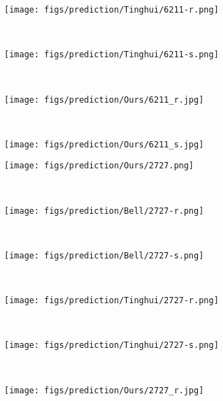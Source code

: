 \documentclass[10pt,twocolumn,letterpaper]{article}
\begin{document}
\begin{figure*}[ptb]
    \begin{subfigure}[b]{0.135\textwidth}
        \texttt{[image: figs/prediction/Tinghui/6211-r.png]}
    \end{subfigure} \hspace*{-0.8em}
    ~    
    \begin{subfigure}[b]{0.135\textwidth}
        \texttt{[image: figs/prediction/Tinghui/6211-s.png]}
    \end{subfigure}   \hspace*{-0.8em}
    ~
    \begin{subfigure}[b]{0.135\textwidth}
        \texttt{[image: figs/prediction/Ours/6211\_r.jpg]}
    \end{subfigure}   \hspace*{-0.8em}
    ~    
    \begin{subfigure}[b]{0.135\textwidth}
        \texttt{[image: figs/prediction/Ours/6211\_s.jpg]}
    \end{subfigure} 
	 \begin{subfigure}[b]{0.135\textwidth}
        \texttt{[image: figs/prediction/Ours/2727.png]}
    \end{subfigure} \hspace*{-0.8em}
    ~
    \begin{subfigure}[b]{0.135\textwidth}
        \texttt{[image: figs/prediction/Bell/2727-r.png]}
    \end{subfigure} \hspace*{-0.8em}
    ~
    \begin{subfigure}[b]{0.135\textwidth}
        \texttt{[image: figs/prediction/Bell/2727-s.png]}
    \end{subfigure} \hspace*{-0.8em}
    ~
    \begin{subfigure}[b]{0.135\textwidth}
        \texttt{[image: figs/prediction/Tinghui/2727-r.png]}
    \end{subfigure} \hspace*{-0.8em}
    ~    
    \begin{subfigure}[b]{0.135\textwidth}
        \texttt{[image: figs/prediction/Tinghui/2727-s.png]}
    \end{subfigure}   \hspace*{-0.8em}
    ~
    \begin{subfigure}[b]{0.135\textwidth}
        \texttt{[image: figs/prediction/Ours/2727\_r.jpg]}

\end{subfigure}
\end{figure*}
\end{document}
